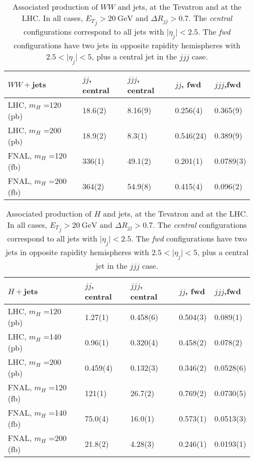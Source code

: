 \documentclass[paper]{JHEP3}
\newcommand{\gev}{\mbox{GeV}}
\newcommand{\ccaption}[2]{
    \begin{center}
    \parbox{0.85\textwidth}{
      \caption[#1]{\small{{#2}}}
      }
    \end{center}
    }
\def    \gev            {\mbox{$\mathrm{GeV}$}}
\def    \mH             {\mbox{$m_H$} }
\def    \et             {\mbox{$E_T$}}
\begin{document}
{\renewcommand{\arraystretch}{1.2}
\begin{table}
\begin{center}
\begin{tabular}{||l|l|l|l|l||}\hline
 $WW+$jets & $jj$, central & 
            $jjj$, central 
& $jj$, fwd 
& $jjj$,fwd 
                 \\  \hline
LHC, \mH=120 (pb)   & 18.6(2) &8.16(9) &0.256(4) & 0.365(9)
\\ \hline	     	    
LHC, \mH=200 (pb)   & 18.9(2) &8.3(1)  &0.546(24)& 0.389(9)
\\ \hline	     	    
FNAL, \mH=120 (fb)  & 336(1)  &49.1(2) &0.201(1) & 0.0789(3) \\ \hline
FNAL, \mH=200 (fb)  & 364(2)  &54.9(8) &0.415(4) & 0.096(2) \\ \hline
\end{tabular}            
\ccaption{}{\label{tab:wwjxs} Associated production of $WW$ and jets,
at the Tevatron and at the LHC. In all cases, $\et_j>20~\gev$ and
$\Delta R_{jj}>0.7$. The {\em central} configurations correspond to
all jets with $\vert \eta_j \vert<2.5$. The {\em fwd} configurations
have two jets in opposite rapidity hemispheres 
with $2.5 < \vert \eta_j \vert<5$, plus a central jet in the $jjj$ case.}
\end{center}
\end{table}}



{\renewcommand{\arraystretch}{1.2}
\begin{table}       
\begin{center}
\begin{tabular}{||l|l|l|l|l||}\hline
 $H+$jets & $jj$, central & 
           $jjj$, central
& $jj$, fwd
& $jjj$,fwd
                 \\  \hline
LHC, \mH=120 (pb)   &1.27(1)  &0.458(6)& 0.504(3) &0.089(1) 
\\ \hline	       	       	  
LHC, \mH=140 (pb)   &0.96(1)  &0.320(4) & 0.458(2) &0.078(2) 
\\ \hline	       	       	  
LHC, \mH=200 (pb)   &0.459(4) &0.132(3) & 0.346(2) &0.0528(6) 
\\ \hline	       	       	  
FNAL, \mH=120 (fb)  & 121(1)  &26.7(2) & 0.769(2) &0.0730(5) 
\\ \hline	       	       	  
FNAL, \mH=140 (fb)  & 75.0(4) &16.0(1) & 0.573(1) &0.0513(3) 
\\ \hline	       	       	  
FNAL, \mH=200 (fb)  &21.8(2)  &4.28(3) & 0.246(1) &0.0193(1) 
\\ \hline
\end{tabular}            
\ccaption{}{\label{tab:hjxs} Associated production of $H$ and jets,
at the Tevatron and at the LHC. In all cases, $\et_j>20~\gev$ and
$\Delta R_{jj}>0.7$. The {\em central} configurations correspond to
all jets with $\vert \eta_j \vert<2.5$. The {\em fwd} configurations
have two jets in opposite rapidity hemispheres 
with $2.5 < \vert \eta_j \vert<5$, plus a central jet in the $jjj$ case.}
\end{center}
\end{table}}
\end{document}
